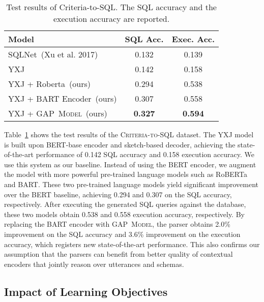 \documentclass[letterpaper]{article} \usepackage{aaai21}  \usepackage{times}  \usepackage{helvet} \usepackage{courier}  \usepackage[hyphens]{url}  \usepackage{graphicx} \usepackage{booktabs}
\newcommand{\modelnamelm}{\textsc{GAP~Model}}
\begin{document}
\begin{table}[t]
  \centering
  \small
    \begin{tabular}{lcc}
    \toprule
    Model & \multicolumn{1}{l}{SQL Acc.} & \multicolumn{1}{l}{Exec. Acc.} \\
    \midrule
    SQLNet~(Xu et al. 2017) & 0.132 & 0.139 \\
YXJ~\cite{yu2020dataset} & 0.142 & 0.158 \\
    \midrule
    YXJ + Roberta~(ours) & 0.294 & 0.538 \\
    YXJ + BART Encoder~(ours) & 0.307 & 0.558 \\
    YXJ + \modelnamelm~(ours) & \textbf{0.327} & \textbf{0.594} \\
    \bottomrule
    \end{tabular}\caption{Test results of Criteria-to-SQL. The SQL accuracy and the execution accuracy are reported.}
  \label{tab:criteria-to-sql}\vspace{-0.1cm}
\end{table}

Table~\ref{tab:criteria-to-sql} shows the test results of the \textsc{Criteria-to-SQL} dataset.
The YXJ model~\cite{yu2020dataset} is built upon BERT-base encoder
and sketch-based decoder, achieving the state-of-the-art performance of 0.142 SQL accuracy and 0.158 execution accuracy.
We use this system as our baseline.
Instead of using the BERT encoder, we augment the model with more powerful pre-trained language models such as RoBERTa and BART.
These two pre-trained language models yield significant improvement over the BERT baseline, achieving 0.294 and 0.307 on the SQL accuracy, respectively.
After executing the generated SQL queries against the database, these two models obtain 0.538 and 0.558 execution accuracy, respectively.
By replacing the BART encoder with \modelnamelm, the parser obtains 2.0\% improvement on the SQL accuracy and 3.6\% improvement on the execution accuracy, which registers new state-of-the-art performance.
This also confirms our assumption that the parsers can benefit from better quality of contextual encoders that jointly reason over utterances and schemas.

\subsection{Impact of Learning Objectives}
\end{document}
